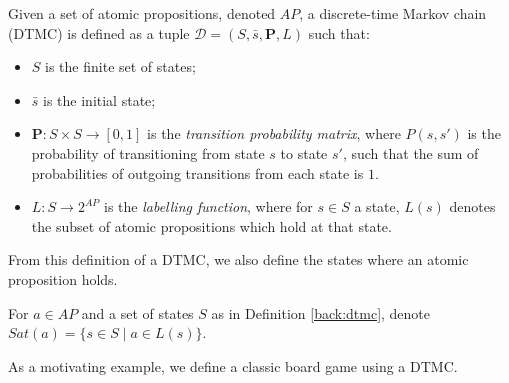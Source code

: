 \begin{definition}
\label{back:dtmc}
    Given a set of atomic propositions, denoted $AP$, a discrete-time Markov chain (DTMC) is defined as a tuple $\mathcal{D} = (S, \bar{s}, \mathbf{P}, L)$ such that:

    \begin{itemize}
        \item $S$ is the finite set of states;
        \item $\bar{s}$ is the initial state;
        \item $\mathbf{P} : S \times S \rightarrow [0,1]$ is the \emph{transition probability matrix}, where $P(s, s')$ is the probability of transitioning from state $s$ to state $s'$, such that the sum of probabilities of outgoing transitions from each state is $1$.
        \item $L: S \rightarrow 2^{AP}$ is the \emph{labelling function}, where for $s \in S$ a state, $L(s)$ denotes the subset of atomic propositions which hold at that state.
    \end{itemize}

\end{definition}

From this definition of a DTMC, we also define the states where an atomic proposition holds.

\begin{definition}
\label{back:sat}

    For $a \in AP$ and a set of states $S$ as in Definition \ref{back:dtmc}, denote $Sat(a) = \{s \in S \mid a \in L(s)\}$.

\end{definition}


As a motivating example, we define a classic board game using a DTMC.

